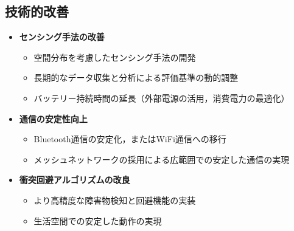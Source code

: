 \documentclass{cuxarticle}
\begin{document}
\subsection{技術的改善}
\begin{itemize}
  \item \textbf{センシング手法の改善}
    \begin{itemize}
      \item 空間分布を考慮したセンシング手法の開発
      \item 長期的なデータ収集と分析による評価基準の動的調整
      \item バッテリー持続時間の延長（外部電源の活用，消費電力の最適化）
    \end{itemize}

  \item \textbf{通信の安定性向上}
    \begin{itemize}
      \item Bluetooth通信の安定化，またはWiFi通信への移行
      \item メッシュネットワークの採用による広範囲での安定した通信の実現
    \end{itemize}

  \item \textbf{衝突回避アルゴリズムの改良}
    \begin{itemize}
      \item より高精度な障害物検知と回避機能の実装
      \item 生活空間での安定した動作の実現
    \end{itemize}
\end{itemize}
\end{document}

